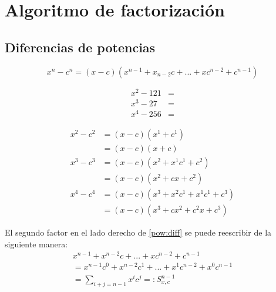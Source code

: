 
\section{Algoritmo de factorización}
\subsection{Diferencias de potencias}


	\begin{prop}
		\begin{equation}
			\label{pow:diff}
			\tag{dP}
			x^{n}-c^{n}=(x-c)\left( x^{n-1}+x_{n-2}c+...+xc^{n-2}+c^{n-1} \right)
		\end{equation}
		
	\end{prop}
	



	\begin{problema}
		\begin{align*}
			x^{2}-121&= \\
			x^{3}-27&= \\
			x^{4}-256&=
		\end{align*}		
	\end{problema}
	



	\begin{problema} 
		\begin{align*} 
			x^{2}-c^{2}
			&=(x-c)\left( x^{1}+c^{1} \right) \\
			&=(x-c)(x+c)  \\ 
			x^{3}-c^{3}
			&=(x-c)\left( x^{2}+x^{1}c^{1}+c^{2} \right)  \\
			& = (x-c)\left( x^{2}+cx+c^{2} \right) \\
			x^{4}-c^{4}
			&=(x-c)\left( x^{3}+x^{2}c^{1}+x^{1}c^{1}+c^{3} \right) \\
			&=(x-c)\left( x^{3}+cx^{2}+c^{2}x+c^{3} \right)
		\end{align*}
		
	\end{problema}
	



	El segundo factor en el lado derecho de \eqref{pow:diff} se puede reescribir de la siguiente manera:  
	\begin{align}
		\nonumber
		x^{n-1}+x^{n-2}c+...+xc^{n-2}+c^{n-1} \\
		\nonumber 
		=x^{n-1}c^{0}+x^{n-2}c^{1}+...+x^{1}c^{n-2}+x^{0}c^{n-1} \\
		\label{sym:sum}
		\tag{pS}
		=\sum_{i+j=n-1}x^{i}c^{j}
		=:S^{n-1}_{x,c}
	\end{align}
	
